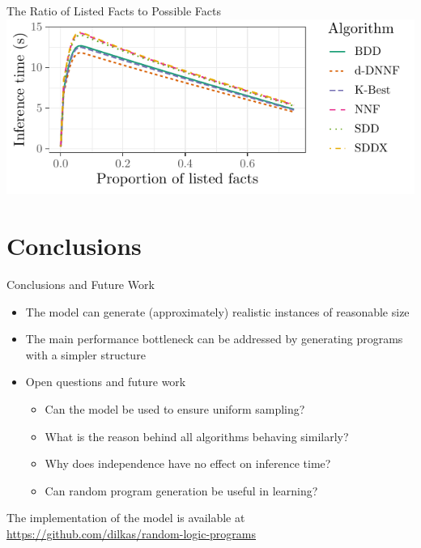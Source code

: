 \documentclass{beamer}
\begin{document}
\begin{frame}{The Ratio of Listed Facts to Possible Facts}
  \includegraphics{proportion.pdf}
\end{frame}

\section{Conclusions}

\begin{frame}{Conclusions and Future Work}
  \begin{itemize}
  \item The model can generate (approximately) realistic instances of reasonable
    size
  \item The main performance bottleneck can be addressed by generating programs
    with a simpler structure
  \item Open questions and future work
    \begin{itemize}
    \item Can the model be used to ensure uniform sampling?
    \item What is the reason behind all algorithms behaving similarly?
    \item Why does independence have no effect on inference time?
    \item Can random program generation be useful in learning?
    \end{itemize}
  \end{itemize}
  \begin{block}{The implementation of the model is available at}
    \url{https://github.com/dilkas/random-logic-programs}
  \end{block}
\end{frame}

\end{document}
